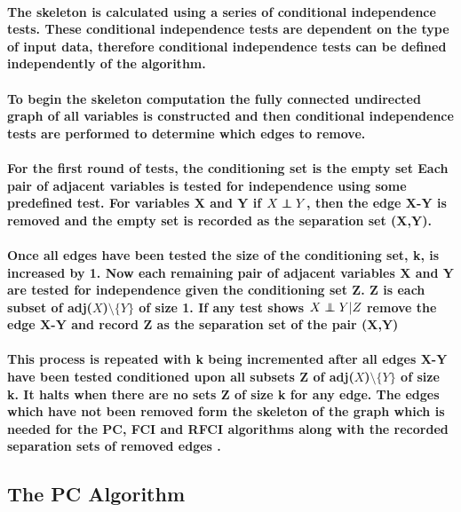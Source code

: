 \documentclass{article}
\newcommand\independent{\protect\mathpalette{\protect\independenT}{\perp}}
\def\independenT#1#2{\mathrel{\rlap{$#1#2$}\mkern2mu{#1#2}}}
\begin{document}
\paragraph{The skeleton is calculated using a series of conditional independence tests. These conditional independence tests are dependent on the type of input data, therefore conditional independence tests can be defined independently of the algorithm.}
\paragraph{To begin the skeleton computation the fully connected undirected graph of all variables is constructed and then conditional independence tests are performed to determine which edges to remove.}

\paragraph{For the first round of tests, the conditioning set is the empty set Each pair of adjacent variables is tested for independence using some predefined test. For variables X and Y if $X \independent Y$, then the edge X-Y is removed and the empty set is recorded as the separation set (X,Y).}

\paragraph{Once all edges have been tested the size of the conditioning set, k, is increased by 1. Now each remaining pair of adjacent variables X and Y are tested for independence given the conditioning set Z. Z is each subset of adj($X$)$\setminus \{Y\}$ of size 1. If any test shows $X \independent Y | Z$ remove the edge X-Y and record Z as the separation set of the pair (X,Y) }

\paragraph{This process is repeated with k being incremented after all edges X-Y have been tested conditioned upon all subsets Z of adj($X$)$\setminus \{Y\}$ of size k. It halts when there are no sets Z of size k for any edge. The edges which have not been removed form the skeleton of the graph which is needed for the PC, FCI and RFCI algorithms along with the recorded separation sets of removed edges \cite{colombo2012learning, spirtes1991algorithm}.}

\subsection{The PC Algorithm}
\end{document}
